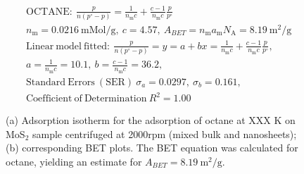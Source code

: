 

\begin{align*}
&\mathrm{OCTANE:}\ \frac{p}{n(p^\circ-p)}=\frac{1}{n_\mathrm{m}c}+\frac{c-1}{n_\mathrm{m}c}\frac{p}{p^\circ}\\
&{n_\mathrm{m}}=0.0216\ \mathrm{mMol/g},\ c=4.57,\ A_{BET}={n_\mathrm{m}}{a_\mathrm{m}}{N_\mathrm{A}}=8.19\ \mathrm{m}^2\mathrm{/g}\\
&\mathrm{Linear\ model\ fitted:}\ \frac{p}{n(p^\circ-p)}=y=a+bx=\frac{1}{n_\mathrm{m}c}+\frac{c-1}{n_\mathrm{m}c}\frac{p}{p^\circ},\\
&a=\frac{1}{n_\mathrm{m}c}=10.1,\ b=\frac{c-1}{n_\mathrm{m}c}=36.2,\\
&\mathrm{Standard\ Errors\ (SER)}\ \sigma_a=0.0297,\ \sigma_b=0.161,\\
&\mathrm{Coefficient\ of\ Determination}\ R^2 = 1.00
\end{align*}


\begin{figure}[htb]
\hfill
{}
\caption{(a) Adsorption isotherm for the adsorption of octane at XXX K on MoS$_2$ 
sample centrifuged at 2000rpm (mixed bulk and nanosheets);
(b) corresponding BET plots. The BET equation was calculated for octane, yielding an estimate for $A_{BET}=8.19\ \mathrm{m}^2\mathrm{/g}$.}

\label{fig:sa-Reference-As-Supplied-100mg-3mm-30C-S1-SA-10ml}
\end{figure}


